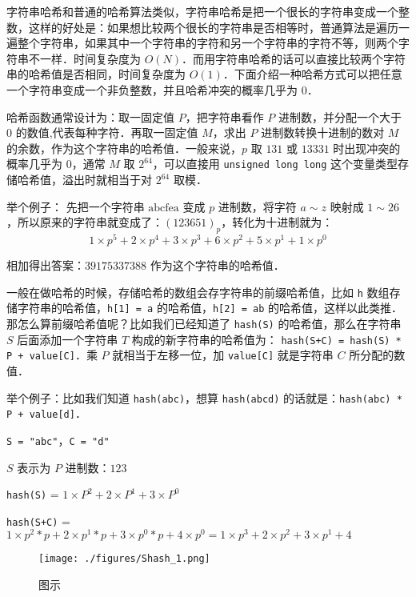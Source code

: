 
字符串哈希和普通的哈希算法类似，字符串哈希是把一个很长的字符串变成一个整数，这样的好处是：如果想比较两个很长的字符串是否相等时，普通算法是遍历一遍整个字符串，如果其中一个字符串的字符和另一个字符串的字符不等，则两个字符串不一样．时间复杂度为 $O(N)$．而用字符串哈希的话可以直接比较两个字符串的哈希值是否相同，时间复杂度为 $O(1)$．下面介绍一种哈希方式可以把任意一个字符串变成一个非负整数，并且哈希冲突的概率几乎为 $0$．

哈希函数通常设计为：取一固定值 $P$，把字符串看作 $P$ 进制数，并分配一个大于 $0$ 的数值,代表每种字符．再取一固定值 $M$，求出 $P$ 进制数转换十进制的数对 $M$ 的余数，作为这个字符串的哈希值．一般来说，$p$ 取 $131$ 或 $13331$ 时出现冲突的概率几乎为 $0$，通常 $M$ 取 $2^{64}$，可以直接用 \verb|unsigned long long| 这个变量类型存储哈希值，溢出时就相当于对 $2^{64}$ 取模．

举个例子：
先把一个字符串 $\text{abcfea}$ 变成 $p$ 进制数，将字符 $a \sim z$ 映射成 $1 \sim 26$，所以原来的字符串就变成了：$(123651)_p$，转化为十进制就为：\begin{equation}
1 \times p^5 + 2 \times p^4 + 3 \times p^3 + 6 \times p^2 + 5 \times p^1 + 1 \times p^0
\end{equation}

相加得出答案：$39175337388$ 作为这个字符串的哈希值．

一般在做哈希的时候，存储哈希的数组会存字符串的前缀哈希值，比如 \verb|h| 数组存储字符串的哈希值，\verb|h[1] = a| 的哈希值，\verb|h[2] = ab| 的哈希值，这样以此类推．那怎么算前缀哈希值呢？比如我们已经知道了 \verb|hash(S)| 的哈希值，那么在字符串 $S$ 后面添加一个字符串 $T$ 构成的新字符串的哈希值为： \verb|hash(S+C) = hash(S) * P + value[C]|．乘 $P$ 就相当于左移一位，加 \verb|value[C]| 就是字符串 $C$ 所分配的数值．

举个例子：比如我们知道 \verb|hash(abc)|，想算 \verb|hash(abcd)| 的话就是：\verb|hash(abc) * P + value[d]|．

\verb|S = "abc"|，\verb|C = "d"|

$S$ 表示为 $P$ 进制数：$123$

\verb|hash(S)| = $1 \times P^2 + 2 \times P^1 + 3 \times P^0$

\verb|hash(S+C)| = $1 \times p^2 *p + 2 \times p^1*p + 3 \times p^0*p + 4 \times p^0 = 1 \times p^3 + 2 \times p ^ 2 + 3 \times p^1 + 4$

\begin{figure}[ht]
\centering
\texttt{[image: ./figures/Shash\_1.png]}
\caption{图示} \label{Shash_fig1}
\end{figure}

